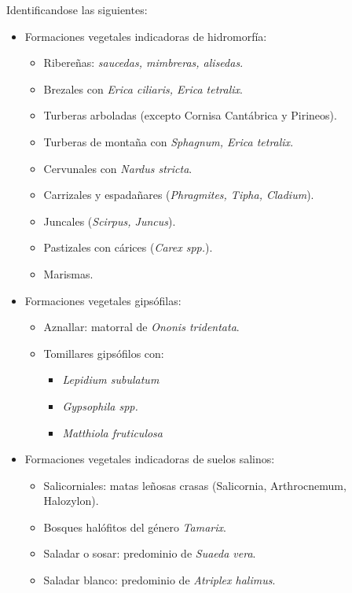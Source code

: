 Identificandose las siguientes:
\begin{itemize}
    \item Formaciones vegetales indicadoras de hidromorfía:
    \begin{itemize}
        \item Ribereñas: \textit{saucedas, mimbreras, alisedas}.
        \item Brezales con \textit{Erica ciliaris, Erica tetralix}.
        \item Turberas arboladas (excepto Cornisa Cantábrica y Pirineos).
        \item Turberas de montaña con \textit{Sphagnum, Erica tetralix}.
        \item Cervunales con \textit{Nardus stricta}.
        \item Carrizales y espadañares (\textit{Phragmites, Tipha, Cladium}).
        \item Juncales (\textit{Scirpus, Juncus}).
        \item Pastizales con cárices (\textit{Carex spp.}).
        \item Marismas.
    \end{itemize}
    \item Formaciones vegetales gipsófilas:
    \begin{itemize}
        \item Aznallar: matorral de \textit{Ononis tridentata}.
        \item Tomillares gipsófilos con:
        \begin{itemize}
            \item \textit{Lepidium subulatum}
            \item \textit{Gypsophila spp.}
            \item \textit{Matthiola fruticulosa}
        \end{itemize}
    \end{itemize}
    \item   Formaciones vegetales indicadoras de suelos salinos:
    \begin{itemize}
        \item Salicorniales: matas leñosas crasas (Salicornia, Arthrocnemum, Halozylon).
        \item Bosques halófitos del género \textit{Tamarix}.
        \item Saladar o sosar: predominio de \textit{Suaeda vera}.
        \item Saladar blanco: predominio de \textit{Atriplex halimus}.
    \end{itemize}
\end{itemize}

